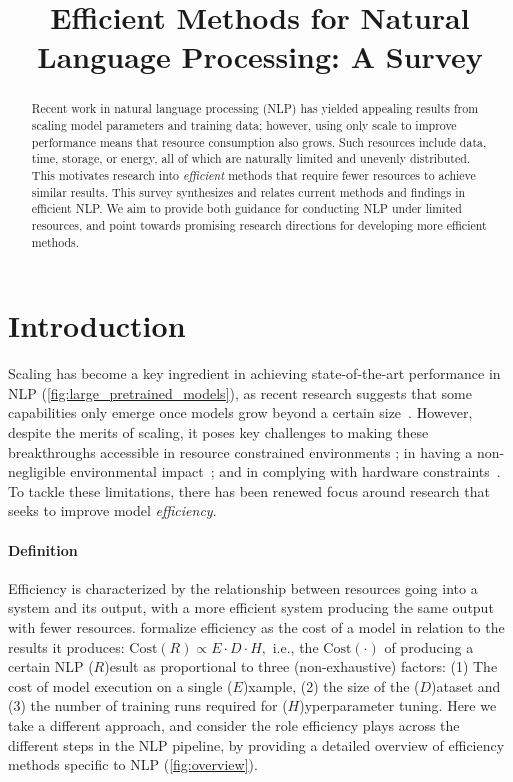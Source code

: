 \title{Efficient Methods for Natural Language Processing: A Survey}

\begin{abstract}
Recent work in natural language processing (NLP) has yielded appealing results from scaling model parameters and training data; however, using only scale to improve performance means that resource consumption also grows. Such resources include data, time, storage, or energy, all of which are naturally limited and unevenly distributed. This motivates research into \textit{efficient} methods that require fewer resources to achieve similar results. This survey synthesizes and relates current methods and findings in efficient NLP. We aim to provide both guidance for conducting NLP under limited resources, and point towards promising research directions for developing more efficient methods.
\end{abstract}

\section{Introduction}
Scaling has become a key ingredient in achieving state-of-the-art performance in NLP (\ref{fig:large_pretrained_models}), 
as recent research suggests that some capabilities only emerge once models grow beyond a certain size~\citep{wei_emergent_2022}. However, despite the merits of scaling, it poses key challenges to making these breakthroughs accessible in resource constrained environments \citep{ahmed2020dedemocratization}; in having a non-negligible environmental impact~\citep{Strubell:2019,Schwartz:2020,derczynski2020power, patterson2021carbon, wu2022sustainable}; and in complying with hardware constraints~\citep{thompson2020computational}. To tackle these limitations, there has been renewed focus around research that seeks to improve model \textit{efficiency}.

\paragraph{Definition} 
Efficiency is characterized by the relationship between resources going into a system and its output, with a more efficient system producing the same output with fewer resources. 
\citet{Schwartz:2020} formalize efficiency as the cost of a model in relation to the results it produces: $\mathrm{Cost}(R) \propto E \cdot D\cdot H,$ i.e., the $\mathrm{Cost}(\cdot)$ of producing a certain NLP ($R$)esult as proportional to three (non-exhaustive) factors: (1) The cost of model execution on a single ($E$)xample, (2) the size of the ($D$)ataset and (3) the number of training runs required for ($H$)yperparameter tuning. Here we take a different approach, and consider the role efficiency plays across the different steps in the NLP pipeline, by providing a detailed overview of efficiency methods specific to NLP
 (\ref{fig:overview}). 

